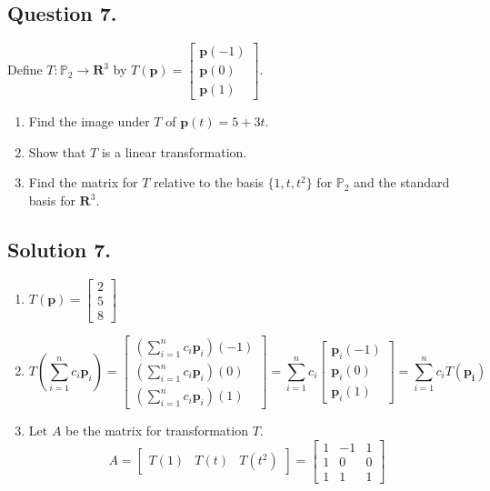\documentclass{article}
\begin{document}
\subsection*{Question 7.}
Define $T:\mathbb{P}_2\to \mathbf{R}^3$ by $T(\mathbf{p})=\left[\begin{array}{r}
\mathbf{p}(-1) \\
\mathbf{p}(0) \\
\mathbf{p}(1) 
\end{array}\right]$.
\begin{enumerate} [label=(\arabic*)]
    \item Find the image under $T$ of $\mathbf{p}(t)=5+3t$.
    \item Show that $T$ is a linear transformation.
    \item Find the matrix for $T$ relative to the basis $\{1,t,t^2\}$ for $\mathbb{P}_2$ and the standard basis for $\mathbf{R}^3$.
\end{enumerate}
\subsection*{Solution 7.}
\begin{enumerate}
    \item $T(\mathbf{p})=\left[\begin{array}{r}2 \\5 \\8 \end{array}\right]$
    \item \[T(\sum_{i=1}^n c_i\mathbf{p}_i)=\left[\begin{array}{r} (\sum_{i=1}^n c_i\mathbf{p}_i)(-1)\\(\sum_{i=1}^n c_i\mathbf{p}_i)(0) \\(\sum_{i=1}^n c_i\mathbf{p}_i)(1) \end{array}\right]=\sum_{i=1}^n c_i\left[\begin{array}{r} \mathbf{p}_i(-1)\\\mathbf{p}_i(0) \\\mathbf{p}_i(1) \end{array}\right]=\sum_{i=1}^n c_i T(\mathbf{p_i})\]
    \item Let $A$ be the matrix for transformation $T$.
    \[A=[\begin{array}{rrr}T(1)&T(t)&T(t^2)\end{array}]=\left[\begin{array}{rrr}
    1 & -1 & 1 \\
    1 &  0 & 0 \\
    1 &  1 & 1 
    \end{array}\right]\]
\end{enumerate}
\end{document}
